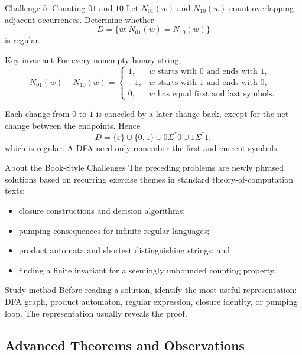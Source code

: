 \documentclass[10pt]{beamer}
\begin{document}
\begin{frame}{Challenge 5: Counting $01$ and $10$}
  \small
  Let $N_{01}(w)$ and $N_{10}(w)$ count overlapping adjacent occurrences.
  Determine whether
  \[
    D=\{w:N_{01}(w)=N_{10}(w)\}
  \]
  is regular.
  \begin{block}{Key invariant}
    For every nonempty binary string,
    \[
      N_{01}(w)-N_{10}(w)=
      \begin{cases}
        1,&w\text{ starts with }0\text{ and ends with }1,\\
       -1,&w\text{ starts with }1\text{ and ends with }0,\\
        0,&w\text{ has equal first and last symbols}.
      \end{cases}
    \]
  \end{block}
  Each change from $0$ to $1$ is canceled by a later change back, except for
  the net change between the endpoints. Hence
  \[
    D=\{\varepsilon\}\cup\{0,1\}
      \cup0\Sigma^*0\cup1\Sigma^*1,
  \]
  which is regular. A DFA need only remember the first and current symbols.
\end{frame}

\begin{frame}{About the Book-Style Challenges}
  \small
  The preceding problems are newly phrased solutions based on recurring
  exercise themes in standard theory-of-computation texts:
  \begin{itemize}
    \item closure constructions and decision algorithms;
    \item pumping consequences for infinite regular languages;
    \item product automata and shortest distinguishing strings; and
    \item finding a finite invariant for a seemingly unbounded counting
      property.
  \end{itemize}
  \begin{alertblock}{Study method}
    Before reading a solution, identify the most useful representation:
    DFA graph, product automaton, regular expression, closure identity, or
    pumping loop. The representation usually reveals the proof.
  \end{alertblock}
\end{frame}

\subsection{Advanced Theorems and Observations}
\end{document}
